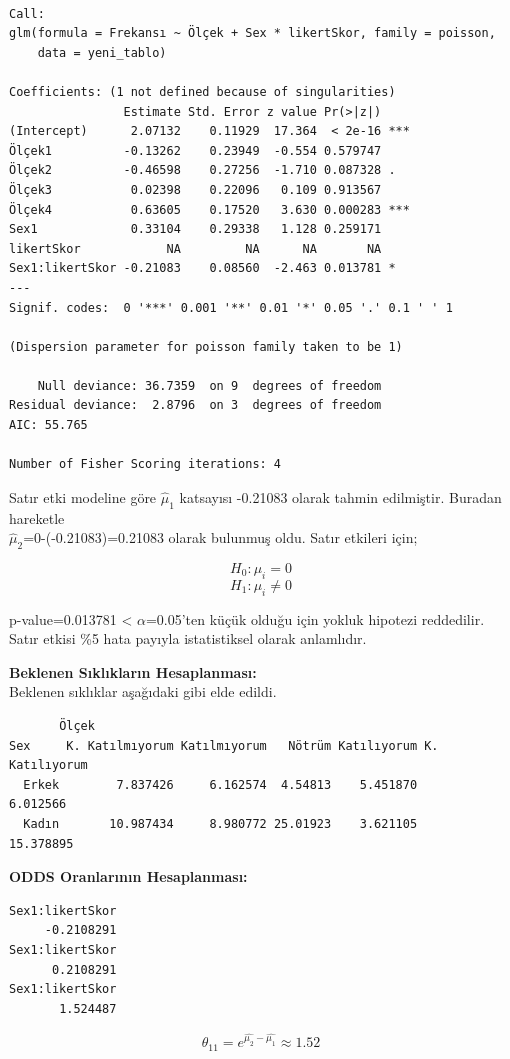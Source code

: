 \documentclass{article}
\begin{document}
\begin{verbatim}

Call:
glm(formula = Frekansı ~ Ölçek + Sex * likertSkor, family = poisson, 
    data = yeni_tablo)

Coefficients: (1 not defined because of singularities)
                Estimate Std. Error z value Pr(>|z|)    
(Intercept)      2.07132    0.11929  17.364  < 2e-16 ***
Ölçek1          -0.13262    0.23949  -0.554 0.579747    
Ölçek2          -0.46598    0.27256  -1.710 0.087328 .  
Ölçek3           0.02398    0.22096   0.109 0.913567    
Ölçek4           0.63605    0.17520   3.630 0.000283 ***
Sex1             0.33104    0.29338   1.128 0.259171    
likertSkor            NA         NA      NA       NA    
Sex1:likertSkor -0.21083    0.08560  -2.463 0.013781 *  
---
Signif. codes:  0 '***' 0.001 '**' 0.01 '*' 0.05 '.' 0.1 ' ' 1

(Dispersion parameter for poisson family taken to be 1)

    Null deviance: 36.7359  on 9  degrees of freedom
Residual deviance:  2.8796  on 3  degrees of freedom
AIC: 55.765

Number of Fisher Scoring iterations: 4
\end{verbatim}

Satır etki modeline göre $\hat{\mu}_1$ katsayısı -0.21083 olarak tahmin edilmiştir. Buradan hareketle \\
$\hat{\mu}_2$=0-(-0.21083)=0.21083 olarak bulunmuş oldu. Satır etkileri için;  

\[
H_0: \mu_{i} = 0
\]
\[
H_1: \mu_{i} \neq 0
\]

p-value=0.013781 < $\alpha$=0.05’ten küçük olduğu için yokluk hipotezi reddedilir. Satır etkisi \%5 hata payıyla istatistiksel olarak anlamlıdır.

\vspace{10pt}
\textbf{Beklenen Sıklıkların Hesaplanması:} \\
Beklenen sıklıklar aşağıdaki gibi elde edildi.
\begin{verbatim}
       Ölçek
Sex     K. Katılmıyorum Katılmıyorum   Nötrüm Katılıyorum K. Katılıyorum
  Erkek        7.837426     6.162574  4.54813    5.451870       6.012566
  Kadın       10.987434     8.980772 25.01923    3.621105      15.378895
\end{verbatim}

\vspace{10pt}
\textbf{ODDS Oranlarının Hesaplanması:} \\
\begin{verbatim}
Sex1:likertSkor 
     -0.2108291 
Sex1:likertSkor 
      0.2108291 
Sex1:likertSkor 
       1.524487 
\end{verbatim}
$$\theta_{11} = e^{\hat{\mu_2} - \hat{\mu_1}} \approx 1.52$$ \\
\end{document}
